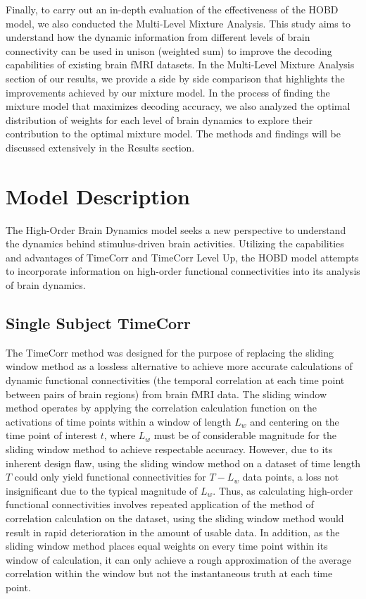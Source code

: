 \documentclass[11pt]{article}
\begin{document}
Finally, to carry out an in-depth evaluation of the effectiveness of the HOBD model, we also conducted the Multi-Level Mixture Analysis. This study aims to understand how the dynamic information from different levels of brain connectivity can be used in unison (weighted sum) to improve the decoding capabilities of existing brain fMRI datasets. In the Multi-Level Mixture Analysis section of our results, we provide a side by side comparison that highlights the improvements achieved by our mixture model. In the process of finding the mixture model that maximizes decoding accuracy, we also analyzed the optimal distribution of weights for each level of brain dynamics to explore their contribution to the optimal mixture model. The methods and findings will be discussed extensively in the Results section.

\newpage
\section{Model Description}
The High-Order Brain Dynamics model seeks a new perspective to understand the dynamics behind stimulus-driven brain activities. Utilizing the capabilities and advantages of TimeCorr and TimeCorr Level Up, the HOBD model attempts to incorporate information on high-order functional connectivities into its analysis of brain dynamics.

\subsection{Single Subject TimeCorr}
The TimeCorr method was designed for the purpose of replacing the sliding window method as a lossless alternative to achieve more accurate calculations of dynamic functional connectivities (the temporal correlation at each time point between pairs of brain regions) from brain fMRI data. The sliding window method operates by applying the correlation calculation function on the activations of time points within a window of length $L_w$ and centering on the time point of interest $t$, where $L_w$ must be of considerable magnitude for the sliding window method to achieve respectable accuracy. However, due to its inherent design flaw, using the sliding window method on a dataset of time length $T$ could only yield functional connectivities for $T-L_w$ data points, a loss not insignificant due to the typical magnitude of $L_w$. Thus, as calculating high-order functional connectivities involves repeated application of the method of correlation calculation on the dataset, using the sliding window method would result in rapid deterioration in the amount of usable data. In addition, as the sliding window method places equal weights on every time point within its window of calculation, it can only achieve a rough approximation of the average correlation within the window but not the instantaneous truth at each time point.
\end{document}
